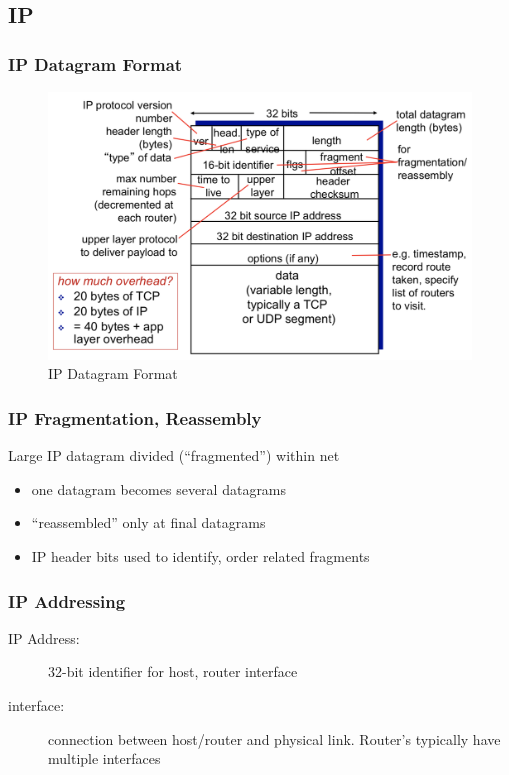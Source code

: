 \subsection{IP}\label{sec:ip}
\subsubsection{IP Datagram Format}
\begin{figure}[H]
	\includegraphics[width=\linewidth]{ip}
	\centering
	\caption{IP Datagram Format}
\end{figure}
\subsubsection{IP Fragmentation, Reassembly}
Large IP datagram divided (``fragmented'') within net
\begin{itemize}
	\item one datagram becomes several datagrams
	\item ``reassembled'' only at final datagrams
	\item IP header bits used to identify, order related fragments
\end{itemize}
\subsubsection{IP Addressing}
\begin{description}
	\item[IP Address:] 32-bit identifier for host, router interface
	\item[interface:] connection between host/router and physical link. Router's typically have multiple interfaces
\end{description}
